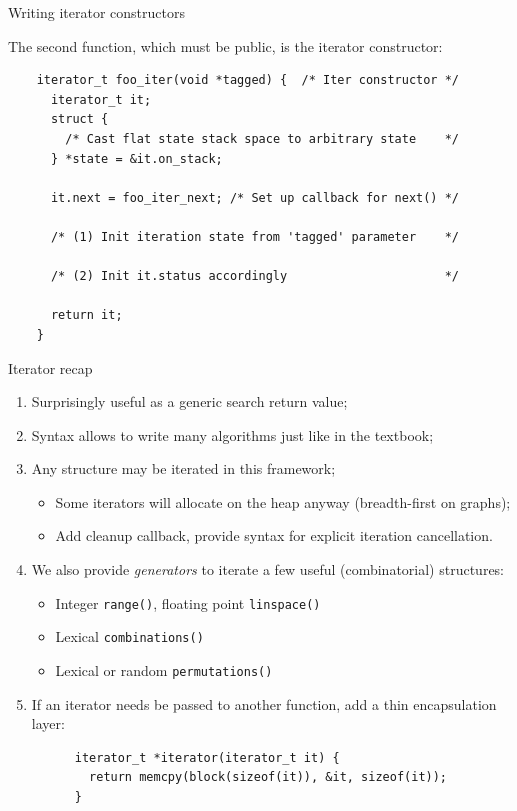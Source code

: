 \begin{frame}[fragile]{Writing iterator constructors}

  The second function, which must be public, is the iterator constructor:
  
  \begin{lstlisting}
    iterator_t foo_iter(void *tagged) {  /* Iter constructor */
      iterator_t it;
      struct {
        /* Cast flat state stack space to arbitrary state    */
      } *state = &it.on_stack; 

      it.next = foo_iter_next; /* Set up callback for next() */

      /* (1) Init iteration state from 'tagged' parameter    */

      /* (2) Init it.status accordingly                      */

      return it;
    }
  \end{lstlisting}

\end{frame}


\begin{frame}[fragile]{Iterator recap}

  \begin{enumerate}
  \item Surprisingly useful as a generic search return value;
  \item Syntax allows to write many algorithms just like in the textbook;
  \item Any structure may be iterated in this framework;
    \begin{itemize}
    \item Some iterators will allocate on the heap anyway (breadth-first on graphs);
    \item Add cleanup callback, provide syntax for explicit iteration cancellation.
    \end{itemize}
  \item We also provide {\em generators} to iterate a few useful (combinatorial) structures:
    \begin{itemize}
    \item Integer \lstinline{range()}, floating point \lstinline{linspace()}
    \item Lexical \lstinline{combinations()}
    \item Lexical or random \lstinline{permutations()}
    \end{itemize}
  \item If an iterator needs be passed to another function, add a thin encapsulation layer:
    \begin{lstlisting}
      iterator_t *iterator(iterator_t it) {
        return memcpy(block(sizeof(it)), &it, sizeof(it));
      }
    \end{lstlisting}
  \end{enumerate}
  
\end{frame}


